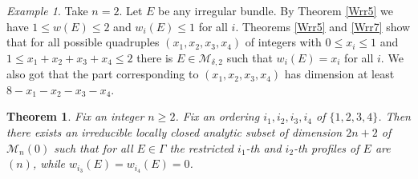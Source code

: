 \documentclass[
  a4paper, 
  reqno, 
  oneside, 
  11pt
]{amsart}
\theoremstyle{plain}	%
\newtheorem{theorem}{Theorem} %
\theoremstyle{mydef} %
\theoremstyle{remark}
\newtheorem{example}{Example}
\theoremstyle{definition}
\theoremstyle{remark}
\begin{document}
\begin{example}\label{Wrr8}
Take $n=2$. Let $E$ be any irregular bundle. By Theorem \ref{Wrr5} we have $1\le w(E)\le 2$ and $w_i(E) \le 1$ for all $i$. Theorems \ref{Wrr5} and \ref{Wrr7} show
that for all possible quadruples $(x_1,x_2,x_3,x_4)$ of integers with $0\le x_i\le 1$ and $1\le x_1+x_2+x_3+x_4\le 2$ there is $E\in \mathcal M_{\delta,2}$ such that $w_i(E) =x_i$ for all $i$. We also got that the part corresponding to $(x_1,x_2,x_3,x_4)$ has dimension at least $8-x_1-x_2-x_3-x_4$.
\end{example}


\begin{theorem}\label{rr9}
Fix an integer $n\ge 2$. Fix an ordering $i_1,i_2,i_3,i_4$ of $\{1,2,3,4\}$. Then there exists an irreducible locally closed analytic subset of dimension $2n+2$ of $\mathcal M_n(0)$
such that for all $E\in \Gamma$ the restricted $i_1$-th and $i_2$-th profiles of $E$ are $(n)$, while $w_{i_3}(E)=w_{i_4}(E)=0$.
\end{theorem}
\end{document}
